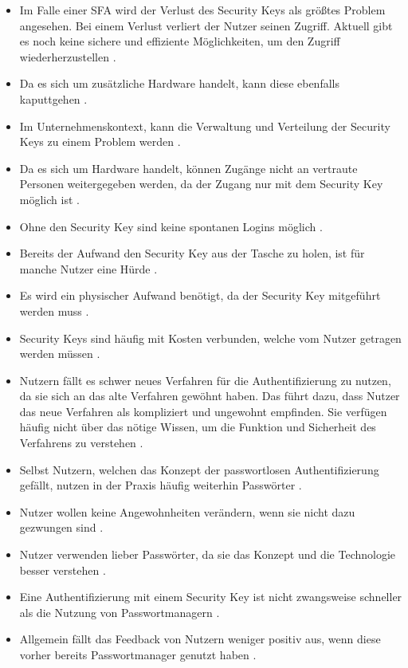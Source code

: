 \begin{itemize}
    \item Im Falle einer \ac{SFA} wird der Verlust des Security Keys als größtes Problem angesehen. Bei einem Verlust verliert der Nutzer seinen Zugriff. Aktuell gibt es noch keine sichere und effiziente Möglichkeiten, um den Zugriff wiederherzustellen \cite{lyastani2020fido2}.
    \item Da es sich um zusätzliche Hardware handelt, kann diese ebenfalls kaputtgehen \cite{farke2020you}.
    \item Im Unternehmenskontext, kann die Verwaltung und Verteilung der Security Keys zu einem Problem werden \cite{farke2020you}. 
    \item Da es sich um Hardware handelt, können Zugänge nicht an vertraute Personen weitergegeben werden, da der Zugang nur mit dem Security Key möglich ist \cite{lyastani2020fido2}.
    \item Ohne den Security Key sind keine spontanen Logins möglich \cite{lyastani2020fido2}.
    \item Bereits der Aufwand den Security Key aus der Tasche zu holen, ist für manche Nutzer eine Hürde \cite{farke2020you}.
    \item Es wird ein physischer Aufwand benötigt, da der Security Key mitgeführt werden muss \cite{lyastani2020fido2}.
    \item Security Keys sind häufig mit Kosten verbunden, welche vom Nutzer getragen werden müssen \cite{lyastani2020fido2}.
    \item Nutzern fällt es schwer neues Verfahren für die Authentifizierung zu nutzen, da sie sich an das alte Verfahren gewöhnt haben. Das führt dazu, dass Nutzer das neue Verfahren als kompliziert und ungewohnt empfinden. Sie verfügen häufig nicht über das nötige Wissen, um die Funktion und Sicherheit des Verfahrens zu verstehen \cite{lyastani2020fido2}.
    \item Selbst Nutzern, welchen das Konzept der passwortlosen Authentifizierung gefällt, nutzen in der Praxis häufig weiterhin Passwörter \cite{farke2020you}.
    \item Nutzer wollen keine Angewohnheiten verändern, wenn sie nicht dazu gezwungen sind \cite{farke2020you}.
    \item Nutzer verwenden lieber Passwörter, da sie das Konzept und die Technologie besser verstehen \cite{lyastani2020fido2}.
    \item Eine Authentifizierung mit einem Security Key ist nicht zwangsweise schneller als die Nutzung von Passwortmanagern \cite{farke2020you}.
    \item Allgemein fällt das Feedback von Nutzern weniger positiv aus, wenn diese vorher bereits Passwortmanager genutzt haben \cite{farke2020you}.
\end{itemize}

